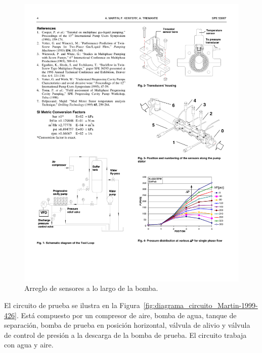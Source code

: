 \begin{figure}

\centering
		
\includegraphics[scale=1,draft=false]{arreglo_sensores_Martin-1999-426} 


\caption{Arreglo de sensores a lo largo de la bomba.}

\label{fig:arreglo_sensores_Martin-1999-426}

\end{figure}

El circuito de prueba se ilustra en la Figura~\ref{fig:diagrama_circuito_Martin-1999-426}. Está compuesto por un compresor de aire, bomba de agua, tanque de separación, bomba de prueba en posición horizontal, válvula de alivio y válvula de control de presión a la descarga de la bomba de prueba. El circuito trabaja con agua y aire.

